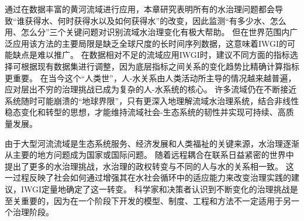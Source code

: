通过在数据丰富的黄河流域进行应用，本章研究表明所有的水治理问题都会导致“谁获得水、何时获得水以及如何获得水”的改变，因此监测“有多少水、怎么用、怎么分”三个关键问题对识别流域水治理变化有极大帮助。
但在世界范围内广泛应用该方法的主要局限是缺乏全球尺度的长时间序列数据，这意味着IWGI的可能缺点是难以推广。
在数据相对不足的流域应用IWGI时，建议不同方面的指标选择可根据现有数据集进行调整，因为底层指标之间关系的变化趋势比精确计算指标更重要。
在当今这个“人类世”，人-水关系由人类活动所主导的情况越来越普遍，应对层出不穷的治理挑战已成为复杂的人-水系统的核心\cite{cumming2018,cumming2014,jaeger2019}。
许多流域仍在不断接近系统随时可能崩溃的“地球界限”\cite{gleeson2020, wang-erlandsson2022}，只有更深入地理解流域水治理系统，结合非线性稳态变化和转型的思想，才能维持流域社会-生态系统的韧性并实现可持续、高质量发展\cite{falkenmark2019}。

由于大型河流流域是生态系统服务、经济发展和人类福祉的关键来源，水治理逐渐从主要的地方问题成为国家或国际问题\cite{best2019,best2020}。
随着远程耦合在联系日益紧密的世界中提出了更多的水治理挑战，水治理的政权转变与不同的人与水的关系相一致\cite{diaz2019}。
这一过程反映了社会如何通过增强其在水社会循环中的适应能力来改变治理实践的建议，IWGI定量地确定了这一转变\cite{loch2020,turton1999}。
科学家和决策者认识到不断变化的治理挑战是至关重要的，因为在一个阶段下开发的模型、制度、工程和方法不一定适用于另一个治理阶段\cite{reyers2018}。
